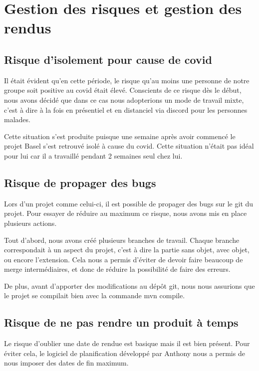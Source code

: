 \documentclass[12pt, a4paper, one side]{article}
\begin{document}
\section{Gestion des risques et gestion des rendus}
\subsection{Risque d'isolement pour cause de covid}
Il était évident qu'en cette période, le risque qu'au moins une personne de notre groupe soit positive au covid était élevé. Conscients de ce risque dès le début, nous avons décidé que dans ce cas nous adopterions un mode de travail mixte, c'est à dire à la fois en présentiel et en distanciel via discord pour les personnes malades.

\begin{flushleft}
Cette situation s'est produite puisque une semaine après avoir commencé le projet Basel s'est retrouvé isolé à cause du covid. Cette situation n'était pas idéal pour lui car il a travaillé pendant 2 semaines seul chez lui.
\end{flushleft}

\subsection{Risque de propager des bugs}
Lors d'un projet comme celui-ci, il est possible de propager des bugs sur le git du projet. Pour essayer de réduire au maximum ce risque, nous avons mis en place plusieurs actions.

\begin{flushleft}
Tout d'abord, nous avons créé plusieurs branches de travail. Chaque branche correspondait à un aspect du projet, c'est à dire la partie sans objet, avec objet, ou encore l'extension. Cela nous a permis d'éviter de devoir faire beaucoup de merge intermédiaires, et donc de réduire la possibilité de faire des erreurs.
\end{flushleft}
\begin{flushleft}
De plus, avant d'apporter des modifications au dépôt git, nous nous assurions que le projet se compilait bien avec la commande mvn compile.
\end{flushleft}

\subsection{Risque de ne pas rendre un produit à temps}
\begin{flushleft}
Le risque d'oublier une date de rendue est basique mais il est bien présent. Pour éviter cela, le logiciel de planification développé par Anthony nous a permis de nous imposer des dates de fin maximum.
\end{flushleft}
\end{document}
